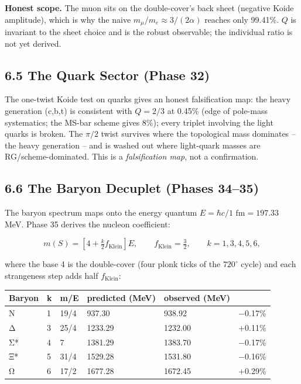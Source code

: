 \documentclass[
  11pt,
]{article}
\begin{document}
\textbf{Honest scope.} The muon sits on the double-cover's back sheet
(negative Koide amplitude), which is why the naive
\(m_\mu/m_e \approx 3/(2\alpha)\) reaches only 99.41\%. \(Q\) is
invariant to the sheet choice and is the robust observable; the
individual ratio is not yet derived.

\subsection{6.5 The Quark Sector (Phase
32)}\label{the-quark-sector-phase-32}

The one-twist Koide test on quarks gives an honest falsification map:
the heavy generation (c,b,t) is consistent with \(Q = 2/3\) at 0.45\%
(edge of pole-mass systematics; the MS-bar scheme gives 8\%); every
triplet involving the light quarks is broken. The \(\pi/2\) twist
survives where the topological mass dominates -- the heavy generation --
and is washed out where light-quark masses are RG/scheme-dominated. This
is a \emph{falsification map}, not a confirmation.

\subsection{6.6 The Baryon Decuplet (Phases
34--35)}\label{the-baryon-decuplet-phases-3435}

The baryon spectrum maps onto the energy quantum
\(E = \hbar c/1\text{ fm} = 197.33\) MeV. Phase 35 derives the nucleon
coefficient:

\[m(S) = \left[4 + \tfrac{k}{2}f_{\text{Klein}}\right]E, \qquad f_{\text{Klein}} = \tfrac{3}{2}, \qquad k = 1, 3, 4, 5, 6,\]

where the base 4 is the double-cover (four plonk ticks of the
\(720^{\circ}\) cycle) and each strangeness step adds half
\(f_{\text{Klein}}\):

\begin{longtable}[]{@{}llllll@{}}
\toprule\noalign{}
Baryon & k & m/E & predicted (MeV) & observed (MeV) & \\
\midrule\noalign{}
\endhead
\bottomrule\noalign{}
\endlastfoot
N & 1 & 19/4 & 937.30 & 938.92 & −0.17\% \\
Δ & 3 & 25/4 & 1233.29 & 1232.00 & +0.11\% \\
Σ* & 4 & 7 & 1381.29 & 1383.70 & −0.17\% \\
Ξ* & 5 & 31/4 & 1529.28 & 1531.80 & −0.16\% \\
Ω & 6 & 17/2 & 1677.28 & 1672.45 & +0.29\% \\
\end{longtable}
\end{document}
